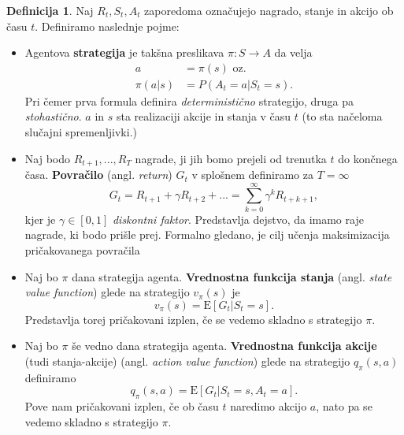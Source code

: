 \documentclass[12pt,a4paper]{amsart}
\theoremstyle{definition} %
\newtheorem{definicija}{Definicija}[section]
\theoremstyle{plain} %
\begin{document}
\begin{definicija}
    Naj $R_t, S_t, A_t$ zaporedoma označujejo nagrado, stanje in akcijo ob času $t$. Definiramo 
    naslednje pojme: 
    \begin{itemize}
        \item Agentova \textbf{strategija} je takšna preslikava $\pi: S \rightarrow A$
                da velja 
                \begin{align*}
                a &= \pi(s) \text{ oz.}\\
                \pi(a | s) &= P(A_t = a | S_t = s). 
                \end{align*}
                Pri čemer prva formula definira \textit{deterministično} strategijo, druga pa 
                \textit{stohastično}. $a$ in $s$ sta realizaciji akcije in stanja v času $t$ 
                (to sta načeloma slučajni spremenljivki.)
        
        \item Naj bodo $R_{t+1}, ...,R_T$ nagrade, ji jih bomo prejeli od trenutka 
                $t$ do končnega časa. \textbf{Povračilo} (angl. \textit{return}) $G_t$ v splošnem 
                definiramo za $T=\infty$
                $$
                G_t = R_{t+1} + \gamma R_{t+2} + ... = \sum_{k=0}^\infty \gamma^k R_{t + k + 1} ,
                $$
                kjer je $\gamma \in [0,1]$ \textit{diskontni faktor}. Predstavlja dejstvo, da 
                imamo raje nagrade, ki bodo prišle prej. Formalno gledano, je cilj učenja 
                maksimizacija pričakovanega povračila

         \item Naj bo $\pi$ dana strategija agenta. \textbf{Vrednostna funkcija 
                stanja} (angl. \textit{state value function}) glede na strategijo $v_\pi(s)$ je
                $$
                v_\pi(s) = \mathrm{E} [G_t | S_t = s].
                $$
                Predstavlja torej pričakovani izplen, če se vedemo skladno s strategijo $\pi$.

        \item Naj bo $\pi$ še vedno dana strategija agenta. \textbf{Vrednostna funkcija 
                akcije} (tudi stanja-akcije) (angl. \textit{action value function}) glede na 
                strategijo $q_\pi(s, a)$ definiramo
                $$
                q_\pi(s, a) = \mathrm{E} [G_t | S_t = s, A_t = a].
                $$
                Pove nam pričakovani izplen, če ob času $t$ naredimo akcijo $a$, nato pa se 
                vedemo skladno s strategijo $\pi$.
    \end{itemize}
\end{definicija}
\end{document}
